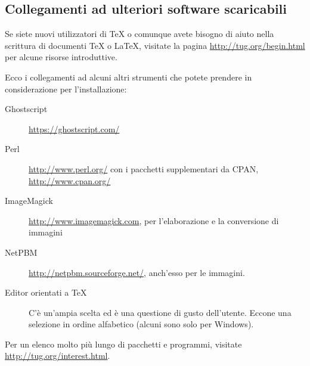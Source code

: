 \documentclass{article}
\begin{document}
\subsection{Collegamenti ad ulteriori software scaricabili}

Se siete nuovi utilizzatori di \TeX{} o comunque avete bisogno di aiuto
nella scrittura di documenti \TeX{} o \LaTeX, visitate la pagina
\url{http://tug.org/begin.html} per alcune risorse introduttive.

Ecco i collegamenti ad alcuni altri strumenti che potete prendere in
considerazione per l'installazione:
\begin{description}
\item[Ghostscript] \url{https://ghostscript.com/}
\item[Perl] \url{http://www.perl.org/} con i pacchetti supplementari da
      CPAN, \url{http://www.cpan.org/}
\item[ImageMagick] \url{http://www.imagemagick.com}, per l'elaborazione e
      la conversione di immagini
\item[NetPBM] \url{http://netpbm.sourceforge.net/}, anch'esso per le
      immagini.

\item[Editor orientati a \TeX] C'è un'ampia scelta ed è una questione di
      gusto dell'utente. Eccone una selezione in ordine alfabetico (alcuni
      sono solo per Windows).
\end{description}
Per un elenco molto più lungo di pacchetti e programmi, visitate
\url{http://tug.org/interest.html}.
\end{document}
